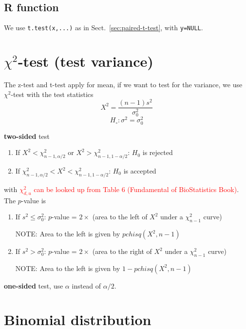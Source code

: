 \subsection{R function}
\label{sec:r-function}

We use \verb!t.test(x,...)! as in Sect.~\ref{sec:paired-t-test}, with
\verb!y=NULL!. 

\section[Chi-square test]{$\chi^2$-test (test variance)}
\label{sec:chi2-test}

The z-test and t-test apply for mean, if we want to test for the
variance, we use $\chi^2$-test with the test statistics
\begin{equation}
  \label{eq:77}
  X^2 = \frac{(n-1)s^2}{\sigma_0^2}
\end{equation}
\begin{equation*}
  H_\circ: \sigma^2 = \sigma_0^2
\end{equation*}

{\bf two-sided} test
\begin{enumerate}
\item If $X^2 < \chi^2_{n-1, \alpha/2}$ or $X^2 > \chi^2_{n-1,
    1-\alpha/2}$: $H_0$ is rejected
\item If $ \chi^2_{n-1, \alpha/2} < X^2 < \chi^2_{n-1, 1-\alpha/2}$:
  $H_0$ is accepted
\end{enumerate}
with
\textcolor{red}{ $\chi^2_{d,u}$ can be looked up from Table 6
  (Fundamental of BioStatistics Book)}.  The $p$-value is
\begin{enumerate}
\item If $s^2 \le \sigma^2_0$: $p$-value = $2\times$ (area to the left
  of $X^2$ under a $\chi^2_{n-1}$ curve)

NOTE: Area to the left is given by $pchisq(X^2,n-1)$

\item If $s^2 > \sigma^2_0$: $p$-value = $2\times$ (area to the right
  of $X^2$ under a $\chi^2_{n-1}$ curve)

  NOTE: Area to the left is given by $1-pchisq(X^2,n-1)$

\end{enumerate}

{\bf one-sided} test, use $\alpha$ instead of $\alpha/2$. 


\section{Binomial distribution}
\label{sec:binom-distr-1}

